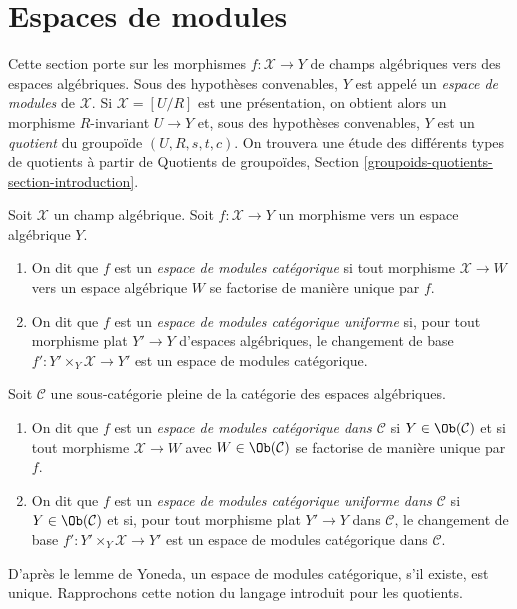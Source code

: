 \section{Espaces de modules}
\label{section-moduli-spaces}

\noindent
Cette section porte sur les morphismes $f : \mathcal{X} \to Y$ de
champs algébriques vers des espaces algébriques. Sous des hypothèses convenables,
$Y$ est appelé un {\it espace de modules} de $\mathcal{X}$. Si
$\mathcal{X} = [U/R]$ est une présentation, on obtient alors un
morphisme $R$-invariant $U \to Y$ et, sous des hypothèses convenables,
$Y$ est un {\it quotient} du groupoïde $(U, R, s, t, c)$.
On trouvera une étude des différents types de quotients
à partir de
Quotients de groupoïdes, Section \ref{groupoids-quotients-section-introduction}.

\begin{definition}
\label{definition-categorical-quotient}
Soit $\mathcal{X}$ un champ algébrique. Soit
$f : \mathcal{X} \to Y$ un morphisme vers un espace algébrique $Y$.
\begin{enumerate}
\item On dit que $f$ est un {\it espace de modules catégorique} si tout morphisme
$\mathcal{X} \to W$ vers un espace algébrique $W$ se factorise de manière unique par $f$.
\item On dit que $f$ est un {\it espace de modules catégorique uniforme}
si, pour tout morphisme plat $Y' \to Y$ d'espaces algébriques, le changement de base
$f' : Y' \times_Y \mathcal{X} \to Y'$ est un espace de modules catégorique.
\end{enumerate}
Soit $\mathcal{C}$ une sous-catégorie pleine de la catégorie des espaces
algébriques.
\begin{enumerate}
\item[(3)] On dit que $f$ est un {\it espace de modules catégorique dans $\mathcal{C}$}
si $Y \in \Ob(\mathcal{C})$ et si tout morphisme $\mathcal{X} \to W$ avec
$W \in \Ob(\mathcal{C})$ se factorise de manière unique par $f$.
\item[(4)] On dit que $f$ est un {\it espace de modules catégorique uniforme dans $\mathcal{C}$}
si $Y \in \Ob(\mathcal{C})$ et si, pour tout morphisme plat $Y' \to Y$ dans
$\mathcal{C}$, le changement de base $f' : Y' \times_Y \mathcal{X} \to Y'$ est un
espace de modules catégorique dans $\mathcal{C}$.
\end{enumerate}
\end{definition}

\noindent
D'après le lemme de Yoneda, un espace de modules catégorique, s'il existe, est unique.
Rapprochons cette notion du langage introduit pour les quotients.

